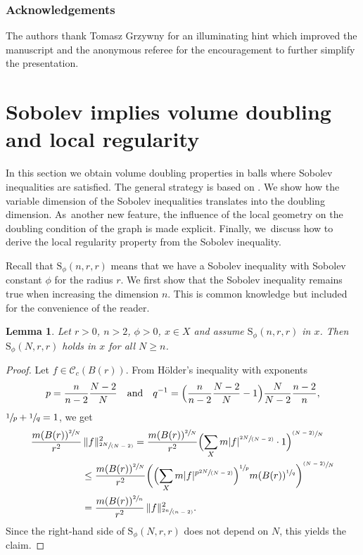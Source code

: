 \documentclass[10pt]{amsart}
\newcommand{\psfrac}[2]{\sfrac{(#1)}{#2}}
\newcommand{\spfrac}[2]{\sfrac{#1}{(#2)}}
\newcommand{\rS}{\mathrm{S}}
\theoremstyle{plain}
\newtheorem{lemma}[theorem]{Lemma}
\theoremstyle{definition}
\newcommand{\cC}{\mathcal{C}}
\begin{document}
\subsubsection*{Acknowledgements}
The authors thank Tomasz Grzywny for an illuminating hint which improved the manuscript and the anonymous referee for the encouragement to further simplify the presentation.

\section{Sobolev implies volume doubling and local regularity}\label{section:doubling}

In this section we obtain volume doubling properties in balls where Sobolev inequalities are satisfied. The general strategy is based on \cite{SaloffC-01}. We show how the variable dimension of the Sobolev inequalities {translates into} the doubling dimension. As~another new feature, the influence of the local geometry on the doubling condition of the graph is made explicit. Finally, we~discuss how to derive the local regularity property from the Sobolev inequality.

Recall that $\rS_\phi(n,r,r)$ means that we have a Sobolev inequality with Sobolev constant $ \phi $ for the radius $ r $. We first show that the Sobolev inequality remains true when increasing the dimension $ n $. This is common knowledge but included for the convenience of the reader.

\begin{lemma}\label{lem:sobdim} Let $r>0$, $n>2$, $\phi>0$, $x\in X$ and assume $\rS_\phi(n, r,r)$ in $x$. Then $\rS_\phi(N,r,r)$ holds in $x$ for all $N\geq n$.
\end{lemma}
\begin{proof}
Let $f\in\cC_{c}(B(r))$. From Hölder's inequality with exponents
\[
p=\frac{n}{n-2}\frac{N-2}{N}\quad\text{and}\quad q^{-1}=\Bigl(\frac{n}{n-2}\frac{N-2}{N}-1\Bigr)\frac{N}{N-2}\frac{n-2}{n},
\]
\ie $ \sfrac1p+\sfrac1q=1 $, we get
\begin{align*}
\frac{m(B(r))^{\sfrac{2}{N}}}{r^2}&\,\Vert f\Vert_{\spfrac{2N}{N-2}}^2 =\frac{m(B(r))^{\sfrac{2}{N}}}{r^2}\Bigl(\sum_{X} m |f|^{\spfrac{2N}{N-2}}\cdot 1\Bigr)^{\psfrac{N-2}{N}}
\\
&\leq
\frac{m(B(r))^{\sfrac{2}{N}}}{r^2}\biggl(\Bigl(\sum_{X} m |f|^{p\spfrac{2N}{N-2}}\Bigr)^{\sfrac{1}{p}}m(B(r))^{\sfrac{1}{q}}\biggr)^{\psfrac{N-2}{N}}\\
&=\frac{m(B(r))^{\sfrac{2}{n}}}{r^2}\,\Vert f\Vert_{\spfrac{2n}{n-2}}^2.
\end{align*}
Since the right-hand side of $\rS_{\phi}(N,r,r)$ does not depend on $ N $, this yields the claim.
\end{proof}
\end{document}
